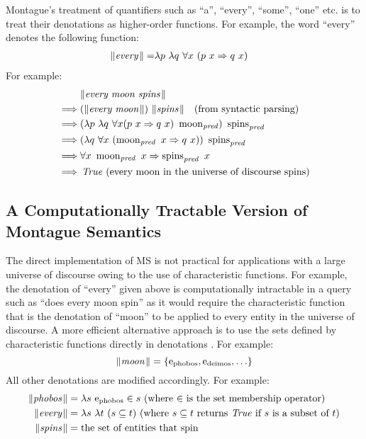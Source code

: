\documentclass[../main.tex]{subfiles}
\begin{document}
\begin{refsection}
Montague's treatment of quantifiers such as ``a'', ``every'', ``some'', ``one'' etc. is to treat their
denotations as higher-order functions. For example, the word ``every'' denotes the following function:
\begin{align*}
	\lVert\textit{every\hspace{0.1em}}\rVert =& \lambda p \  \lambda q \  \forall x \  (p \  x \Rightarrow q \  x)
\end{align*}
For example:
\begin{equation*}
	\begin{split}
		& \lVert\textit{every moon spins\hspace{0.1em}}\rVert \\
		\implies&  (\lVert\textit{every moon\hspace{0.1em}}\rVert) \  \lVert\textit{spins\hspace{0.1em}}\rVert \quad(\text{from syntactic parsing}) \\
		\implies&  (\lambda p \  \lambda q \  \forall x (p \  x \Rightarrow q \  x) \  \operatorname{\operatorname{moon}}_{\operatorname{\mathit{pred}}}) \  \operatorname{\operatorname{spins}}_{\operatorname{\mathit{pred}}} \\
		\implies&  (\lambda q \  \forall x \  (\operatorname{\operatorname{moon}}_{\operatorname{\mathit{pred}}} \   x \Rightarrow q \   x)) \  \operatorname{spins}_{\operatorname{\mathit{pred}}} \\
		\implies&  \forall x \  \operatorname{\operatorname{moon}}_{\operatorname{\mathit{pred}}} \ x \Rightarrow \operatorname{spins}_{\operatorname{\mathit{pred}}} \   x \\
		\implies&  \operatorname{\mathit{True}}\ (\text{every moon in the universe of discourse spins})
	\end{split}
\end{equation*}
\subsection{A Computationally Tractable Version of Montague Semantics} %
\label{icsc2020conf:frostmont}
The direct implementation of MS is not practical for applications with a large universe of discourse
owing to the use of characteristic functions. For example, the denotation of ``every'' given above is
computationally intractable in a query such as ``does every moon spin'' as it would require the
characteristic function that is the denotation of ``moon'' to be applied to every entity in the universe of
discourse. A more efficient alternative approach is to use the sets defined by characteristic functions
directly in denotations \cite{frost1989constructing, frost2002efficient}. For example:
\[ \lVert\textit{moon\hspace{0.1em}}\rVert = \{\mathrm{e}_{\operatorname{\operatorname{phobos}}} , \mathrm{e}_{\operatorname{\operatorname{deimos}}}, \ldots\} \]
All other denotations are modified accordingly. For example:
\begin{align*}
	\meaningof{phobos} &= \lambda s \ \entityassoc{\phobos} \in s\ \dmathrm{(where $\in$ is the set membership operator)} \\
	\meaningof{every} &= \lambda s \  \lambda t \ (s \subseteq t)\ \dmathrm{(where $s \subseteq t$ returns $\True$ if $s$ is a subset of $t$)} \\
	\meaningof{spins} &= \dmathrm{the set of entities that spin}
\end{align*}


\end{refsection}
\end{document}
